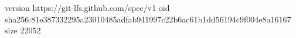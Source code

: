 version https://git-lfs.github.com/spec/v1
oid sha256:81e387332295a23010485adfab941997c22b6ac61b1dd56194c9f004e8a16167
size 22052
